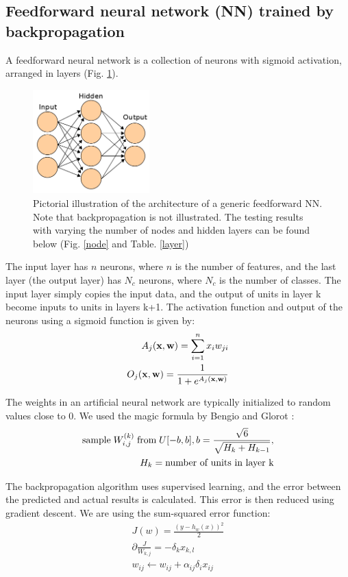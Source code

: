 \documentclass[conference]{IEEEtran}
\begin{document}
\subsection{Feedforward neural network (NN) trained by backpropagation}
A feedforward neural network is a collection of neurons with sigmoid activation, arranged in layers (Fig. \ref{nn}).
\begin{figure}[H]
\centering
\includegraphics[width=0.4\textwidth]{ANN.png}
\caption{\scriptsize Pictorial illustration of the architecture of a generic feedforward NN. Note that backpropagation is not illustrated. The testing results with varying the number of nodes and hidden layers can be found below (Fig. \ref{node} and Table. \ref{layer})}
\label{nn}
\end{figure}
The input layer has $n$ neurons, where $n$ is the number of features, and the last layer (the output layer) has $N_{c}$ neurons,
where $N_{c}$ is the number of classes. The input layer simply copies the input data, and the output of units in layer {k}
become inputs to units in layers {k+1}. The activation function and output of the neurons using a sigmoid function is given by:
\begin{align*}
A_{j}(\bold{x},\bold{w}) = \sum_{i=1}^{n}x_{i}w_{ji} \\
O_{j}(\bold{x},\bold{w}) = \frac{1}{1+e^{A_{j}(\bold{x},\bold{w})}}
\end{align*}

The weights in an artificial neural network are typically initialized to random values close to 0. We used the magic formula
by Bengio and Glorot \cite{GlorotAISTATS2010}: 
\begin{align*}
\textup{sample}\; W_{i,j}^{(k)}\; \textup{from}\; U[-b,b], b=\frac{\sqrt{6}}{\sqrt{H_{k}+H_{k-1}}},\\
H_{k} = \textup{number of units in layer {k}}
\end{align*}

The backpropagation algorithm uses supervised learning, and the error between the predicted and actual results is calculated. This
error is then reduced using gradient descent. We are using the sum-squared error function:
\begin{align*}
J(w) = \frac{(y - h_w(x))^{2}}{2} \\
\partial \frac{J}{W_{k,j}} = -\delta_{k}x_{k,l} \\
w_{ij}\leftarrow w_{ij} + \alpha_{ij} \delta_{i}x_{ij} \\
\end{align*}
\end{document}
